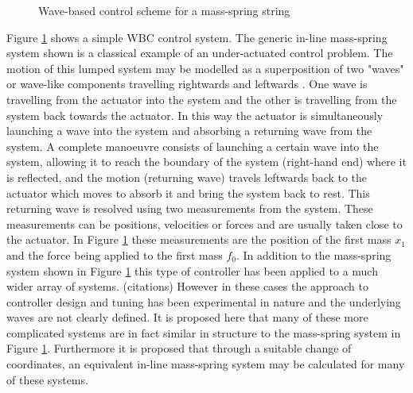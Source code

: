 \documentclass{mbd_fullpaper}
\begin{document}
\begin{figure}[h]
  \begin{center}
    	
	\caption{Wave-based control scheme for a mass-spring string \label{fig:wave-based-control}}
  \end{center}
\end{figure}
Figure \ref{fig:wave-based-control} shows a simple WBC control system.
The generic in-line mass-spring system shown is a classical example of an under-actuated control problem.
The motion of this lumped system may be modelled as a superposition of two "waves" or wave-like components travelling rightwards and leftwards \cite{OConnor2011}.
One wave is travelling from the actuator into the system and the other is travelling from the system back towards the actuator.
In this way the actuator is simultaneously launching a wave into the system and absorbing a returning wave from the system.
A complete manoeuvre consists of launching a certain wave into the system,
allowing it to reach the boundary of the system (right-hand end) where it is reflected,
and the motion (returning wave) travels leftwards back to the actuator which moves to absorb it and bring the system back to rest.
This returning wave is resolved using two measurements from the system.
These measurements can be positions, velocities or forces and are usually taken close to the actuator.
In Figure \ref{fig:wave-based-control} these measurements are the position of the first mass $x_1$ and the force being applied to the first mass $f_0$.
In addition to the mass-spring system shown in Figure \ref{fig:wave-based-control} this type of controller has been applied to a much wider array of systems. (citations)
However in these cases the approach to controller design and tuning has been experimental in nature and the underlying waves are not clearly defined.
It is proposed here that many of these more complicated systems are in fact similar in structure to the mass-spring system in Figure \ref{fig:wave-based-control}.
Furthermore it is proposed that through a suitable change of coordinates, an equivalent in-line mass-spring system may be calculated for many of these systems.
\end{document}
